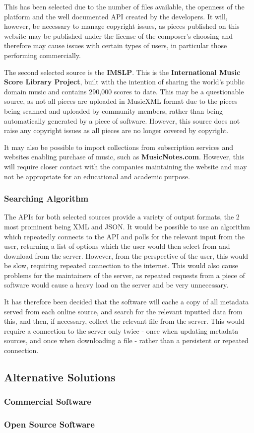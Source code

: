 This has been selected due to the number of files available, the openness of the platform and the well documented API created by the developers. It will, however, be necessary to manage copyright issues, as pieces published on this website may be published under the license of the composer's choosing and therefore may cause issues with certain types of users, in particular those performing commercially.

The second selected source is the \textbf{IMSLP}. This is the \textbf{International Music Score Library Project}, built with the intention of sharing the world’s public domain music and contains 290,000 scores to date.\parencite{imslp} This may be a questionable source, as not all pieces are uploaded in MusicXML format due to the pieces being scanned and uploaded by community members, rather than being automatically generated by a piece of software. However, this source does not raise any copyright issues as all pieces are no longer covered by copyright.

It may also be possible to import collections from subscription services and websites enabling purchase of music, such as \textbf{MusicNotes.com}. However, this will require closer contact with the companies maintaining the website and may not be appropriate for an educational and academic purpose.

\subsubsection{Searching Algorithm}
The APIs for both selected sources provide a variety of output formats, the 2 most prominent being XML and JSON. 
It would be possible to use an algorithm which repeatedly connects to the API and polls for the relevant input from the user, returning a list of options which the user would then select from and download from the server. However, from the perspective of the user, this would be slow, requiring repeated connection to the internet. This would also cause problems for the maintainers of the server, as repeated requests from a piece of software would cause a heavy load on the server and be very unnecessary.

It has therefore been decided that the software will cache a copy of all metadata served from each online source, and search for the relevant inputted data from this, and then, if necessary, collect the relevant file from the server. This would require a connection to the server only twice - once when updating metadata sources, and once when downloading a file - rather than a persistent or repeated connection.
\subsection{Alternative Solutions}
\subsubsection{Commercial Software}
\subsubsection{Open Source Software}